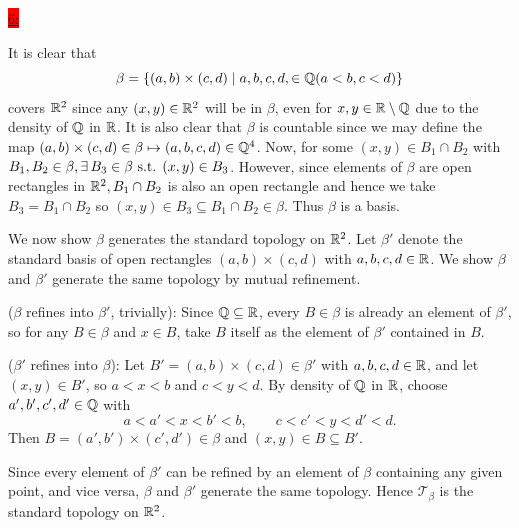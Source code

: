 \documentclass{exam}
\begin{document}
\colorbox{red}{\underline{6:}}
\begin{solution}
    It is clear that 
    \[
        \beta = \left\{(a, b) \times (c, d) \mid a, b, c, d, \in \mathbb Q(a < b, c < d) \right\} 
    \]
    covers $\mathbb R^{2}$ since any $(x, y) \in \mathbb R^{2}$ will be in $\beta$, even for $x, y \in \mathbb R \setminus \mathbb Q$ due to the density of $\mathbb Q$ in $\mathbb R$. It is also clear that $\beta$ is countable since we may define the map $(a, b) \times (c, d) \in \beta \mapsto (a, b, c, d) \in \mathbb Q^{4}$. Now, for some $(x, y) \in B_1 \cap B_2$ with $B_1, B_2 \in \beta, \exists\, B_3 \in \beta \text{ s.t. } (x, y) \in B_3$. However, since elements of $\beta$ are open rectangles in $\mathbb R^2, B_1 \cap B_2$ is also an open rectangle and hence we take $B_3 = B_1 \cap B_2$ so $(x, y) \in B_3 \subseteq B_1 \cap B_2 \in \beta$. Thus $\beta$ is a basis.

    We now show $\beta$ generates the standard topology on $\mathbb R^2$. Let $\beta'$ denote the standard basis of open rectangles $(a,b) \times (c,d)$ with $a,b,c,d \in \mathbb R$. We show $\beta$ and $\beta'$ generate the same topology by mutual refinement.

    ($\beta$ refines into $\beta'$, trivially): Since $\mathbb Q \subseteq \mathbb R$, every $B \in \beta$ is already an element of $\beta'$, so for any $B \in \beta$ and $x \in B$, take $B$ itself as the element of $\beta'$ contained in $B$.

    ($\beta'$ refines into $\beta$): Let $B' = (a,b) \times (c,d) \in \beta'$ with $a,b,c,d \in \mathbb R$, and let $(x,y) \in B'$, so $a < x < b$ and $c < y < d$. By density of $\mathbb Q$ in $\mathbb R$, choose $a', b', c', d' \in \mathbb Q$ with
    \[
        a < a' < x < b' < b, \qquad c < c' < y < d' < d.
    \]
    Then $B = (a', b') \times (c', d') \in \beta$ and $(x,y) \in B \subseteq B'$.

    Since every element of $\beta'$ can be refined by an element of $\beta$ containing any given point, and vice versa, $\beta$ and $\beta'$ generate the same topology. Hence $\mathcal{T}_\beta$ is the standard topology on $\mathbb R^2$.
\end{solution}
\end{document}
